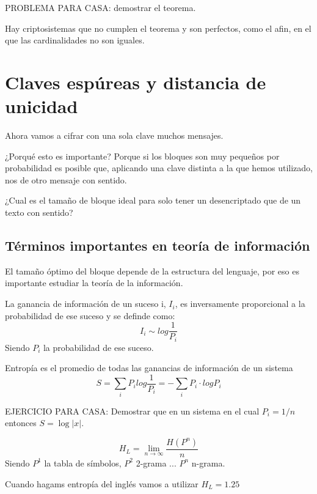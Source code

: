 PROBLEMA PARA CASA: demostrar el teorema.
 
 Hay criptosistemas que no cumplen el teorema y son perfectos, como el afin, en el que las cardinalidades no son iguales.
 
 \section{Claves espúreas y distancia de unicidad}
 
 Ahora vamos a cifrar con una sola clave muchos mensajes.
 
  ¿Porqué esto es importante? Porque si los bloques son muy pequeños por probabilidad es posible que, aplicando una clave distinta a la que hemos utilizado, nos de otro mensaje con sentido.
 
 ¿Cual es el tamaño de bloque ideal para solo tener un desencriptado que de un texto con sentido?
 
 
 \subsection{Términos importantes en teoría de información}
 
 El tamaño óptimo del bloque depende de la estructura del lenguaje, por eso es importante estudiar la teoría de la información.
 
 
 \begin{defn}
 La ganancia de información  de un suceso i, $I_i$, es inversamente proporcional a la probabilidad de ese suceso y se definde como:
 $$I_i \sim log\frac{1}{P_i}$$
 Siendo $P_i$ la probabilidad de ese suceso.
\end{defn}


\begin{defn}[Entropía]
Entropía es el promedio de todas las ganancias de información de un sistema
$$S= \sum_{i} P_i log \frac{1}{P_i} = - \sum_{i}P_i\cdot log P_i$$
\end{defn}


EJERCICIO PARA CASA: Demostrar que en un sistema en el cual $P_i = 1/n$ entonces $S = \log |x|$.

\begin{defn}

$$H_L = \lim\limits_{n\rightarrow \infty} \frac{H(P^n)}{n}$$
Siendo $P^1$ la tabla de símbolos, $P^2$ 2-grama ... $P^n$ n-grama.
\end{defn}


Cuando hagams entropía del inglés vamos a utilizar $H_L = 1.25$


